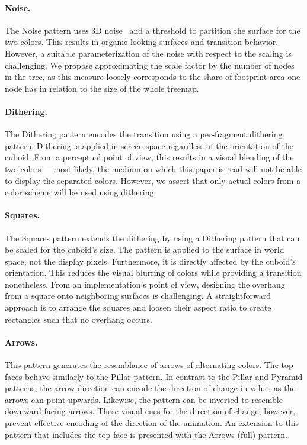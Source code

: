 \documentclass[smallextended,natbib]{svjour3}       %
\begin{document}
\paragraph{Noise.}
The Noise pattern uses 3D noise~\citep{Perlin01} and a threshold to partition the surface for the two colors.
This results in organic-looking surfaces and transition behavior.
However, a suitable parameterization of the noise with respect to the scaling is challenging.
We propose approximating the scale factor by the number of nodes in the tree, as this measure loosely corresponds to the share of footprint area one node has in relation to the size of the whole treemap.

\paragraph{Dithering.}
The Dithering pattern encodes the transition using a per-fragment dithering pattern.
Dithering is applied in screen space regardless of the orientation of the cuboid.
From a perceptual point of view, this results in a visual blending of the two colors~\citep{Ulichney88}---most likely, the medium on which this paper is read will not be able to display the separated colors.
However, we assert that only actual colors from a color scheme will be used using dithering.

\paragraph{Squares.}
The Squares pattern extends the dithering by using a Dithering pattern that can be scaled for the cuboid's size.
The pattern is applied to the surface in world space, not the display pixels.
Furthermore, it is directly affected by the cuboid's orientation.
This reduces the visual blurring of colors while providing a transition nonetheless.
From an implementation's point of view, designing the overhang from a square onto neighboring surfaces is challenging.
A straightforward approach is to arrange the squares and loosen their aspect ratio to create rectangles such that no overhang occurs.

\paragraph{Arrows.} %
This pattern generates the resemblance of arrows of alternating colors.
The top faces behave similarly to the Pillar pattern.
In contrast to the Pillar and Pyramid patterns, the arrow direction can encode the direction of change in value, as the arrows can point upwards.
Likewise, the pattern can be inverted to resemble downward facing arrows.
These visual cues for the direction of change, however, prevent effective encoding of the direction of the animation.
An extension to this pattern that includes the top face is presented with the Arrows (full) pattern.
\end{document}
